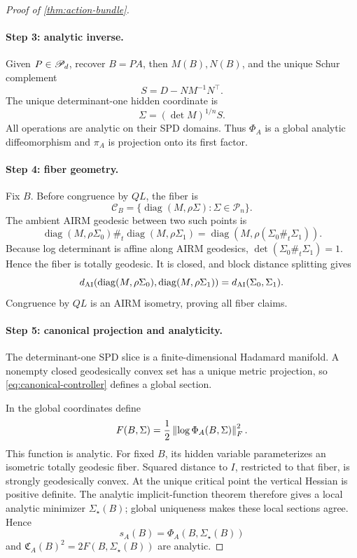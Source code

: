 \begin{proof}[Proof of \cref{thm:action-bundle}]
\paragraph{Step 3: analytic inverse.}
Given \(P\in\mathscr P_d\), recover \(B=PA\), then \(M(B),N(B)\), and the unique
Schur complement
\[
  S=D-NM^{-1}N^\top.
\]
The unique determinant-one hidden coordinate is
\begin{equation}
  \Sigma=(\det M)^{1/n}S.
  \label{eq:appendix-hidden-inverse}
\end{equation}
All operations are analytic on their SPD domains.  Thus \(\Phi_A\) is a
global analytic diffeomorphism and \(\pi_A\) is projection onto its first
factor.

\paragraph{Step 4: fiber geometry.}
Fix \(B\).  Before congruence by \(QL\), the fiber is
\[
  \mathcal C_B
  =\{\operatorname{diag}(M,\rho\Sigma):\Sigma\in\mathscr P_n\}.
\]
The ambient AIRM geodesic between two such points is
\[
  \operatorname{diag}(M,\rho\Sigma_0)
  \#_t
  \operatorname{diag}(M,\rho\Sigma_1)
  =\operatorname{diag}(M,\rho(\Sigma_0\#_t\Sigma_1)).
\]
Because log determinant is affine along AIRM geodesics,
\(\det(\Sigma_0\#_t\Sigma_1)=1\).  Hence the fiber is totally geodesic.
It is closed, and block distance splitting gives
\[
  d_{\mathrm{AI}}(\operatorname{diag}(M,\rho\Sigma_0),
       \operatorname{diag}(M,\rho\Sigma_1))
  =d_{\mathrm{AI}}(\Sigma_0,\Sigma_1).
\]
Congruence by \(QL\) is an AIRM isometry, proving all fiber claims.

\paragraph{Step 5: canonical projection and analyticity.}
The determinant-one SPD slice is a finite-dimensional Hadamard manifold.  A
nonempty closed geodesically convex set has a unique metric projection, so
\cref{eq:canonical-controller} defines a global section.

In the global coordinates define
\[
  F(B,\Sigma)=\frac12\left\lVert \log\Phi_A(B,\Sigma)\right\rVert_F^2.
\]
This function is analytic.  For fixed \(B\), its hidden variable parameterizes
an isometric totally geodesic fiber.  Squared distance to \(I\), restricted to
that fiber, is strongly geodesically convex.  At the unique critical point the
vertical Hessian is positive definite.  The analytic implicit-function theorem
therefore gives a local analytic minimizer \(\Sigma_\star(B)\); global
uniqueness makes these local sections agree.  Hence
\[
  s_A(B)=\Phi_A(B,\Sigma_\star(B))
\]
and \(\mathfrak C_A(B)^2=2F(B,\Sigma_\star(B))\) are analytic.


\end{proof}

